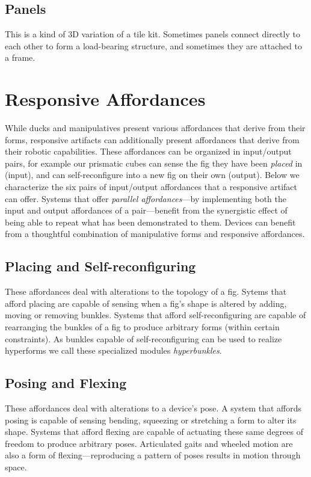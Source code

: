 \subsection{Panels}
%
This is a kind of 3D variation of a tile kit. Sometimes panels connect directly to each other to form a load-bearing structure, and sometimes they are attached to a frame.

\section{Responsive Affordances}
\label{sec:affordances}
%
While ducks and manipulatives present various affordances that derive from their forms, responsive artifacts can additionally present affordances that derive from their robotic capabilities. 
These affordances can be organized in input/output pairs, for example our prismatic cubes can sense the fig they have been \emph{placed} in (input), and can self-reconfigure into a new fig on their own (output). 
Below we characterize the six pairs of input/output affordances that a responsive artifact can offer. 
Systems that offer \emph{parallel affordances}---by implementing both the input and output affordances of a pair---benefit from the synergistic effect of being able to repeat what has been demonstrated to them. 
Devices can benefit from a thoughtful combination of manipulative forms and responsive affordances.

\subsection{Placing and Self-reconfiguring}
%
These affordances deal with alterations to the topology of a fig. 
Sytems that afford placing are capable of sensing when a fig's shape is altered by adding, moving or removing bunkles.
Systems that afford self-reconfiguring are capable of rearranging the bunkles of a fig to produce arbitrary forms (within certain constraints). As bunkles capable of self-reconfiguring can be used to realize hyperforms we call these specialized modules \emph{hyperbunkles}.

\subsection{Posing and Flexing}
%
These affordances deal with alterations to a device's pose. 
A system that affords posing is capable of sensing bending, squeezing or stretching a form to alter its shape. 
Systems that afford flexing are capable of actuating these same degrees of freedom to produce arbitrary poses. 
Articulated gaits and wheeled motion are also a form of flexing---reproducing a pattern of poses results in motion through space.

